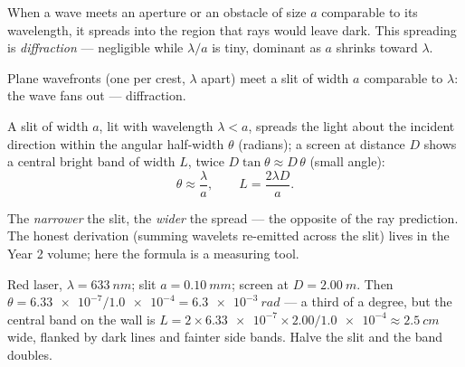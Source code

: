 \begin{definition}[Diffraction]\label{def:g12:light-as-wave:diffraction}
When a wave meets an aperture or an obstacle of size $a$ comparable to
its wavelength, it spreads into the region that rays would leave dark.
This spreading is \emph{diffraction} --- negligible
while $\lambda/a$ is tiny, dominant as $a$ shrinks toward $\lambda$.
\end{definition}

\begin{omfigure}

{\small Plane wavefronts (one per crest, $\lambda$ apart) meet a slit
of width $a$ comparable to $\lambda$: the wave fans out --- diffraction.}
\end{omfigure}

\begin{proposition}\label{prop:g12:light-as-wave:halfwidth}
A slit of width $a$, lit with wavelength $\lambda < a$, spreads the
light about the incident direction within the angular half-width
$\theta$ (radians); a screen at distance $D$ shows a central bright
band of width $L$, twice $D \tan\theta \approx D\,\theta$ (small
angle):
\[
\theta \approx \frac{\lambda}{a}, \qquad L = \frac{2\lambda D}{a}.
\]
\end{proposition}
\admitted

\begin{remark}\label{rem:g12:light-as-wave:honest}
The \emph{narrower} the slit, the \emph{wider} the spread --- the
opposite of the ray prediction. The honest derivation (summing
wavelets re-emitted across the slit) lives in the Year 2 volume; here
the formula is a measuring tool.
\end{remark}

\begin{example}\label{ex:g12:light-as-wave:slit}
Red laser, $\lambda = \qty{633}{nm}$; slit $a = \qty{0.10}{mm}$;
screen at $D = \qty{2.00}{m}$. Then $\theta = \num{6.33e-7} /
\num{1.0e-4} = \qty{6.3e-3}{rad}$ --- a third of a degree, but the
central band on the wall is $L = 2 \times \num{6.33e-7} \times 2.00 /
\num{1.0e-4} \approx \qty{2.5}{cm}$ wide, flanked by dark lines and
fainter side bands. Halve the slit and the band doubles.
\end{example}

